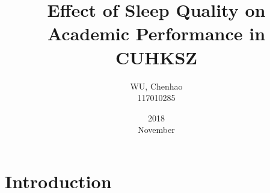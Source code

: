\documentclass[12pt]{article}
\title{Effect of Sleep Quality on Academic Performance in CUHKSZ}
\date{2018 \\November}
\author{WU, Chenhao \\117010285}
\begin{document}
	\maketitle
	\section{Introduction}
	
\end{document}
